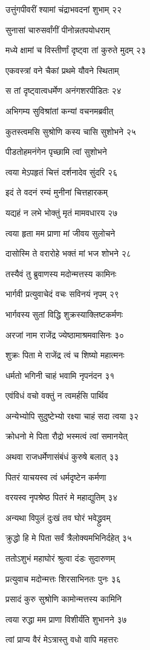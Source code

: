 उत्तुंगपीवरीं श्यामां चंद्राभवदनां शुभाम् २२

सुनासां चारुसर्वांगीं पीनोन्नतपयोधराम्

मध्ये क्षामां च विस्तीर्णां दृष्ट्वा तां कुरुते मुदम् २३

एकवस्त्रां वने चैकां प्रथमे यौवने स्थिताम्

स तां दृष्ट्वात्वधर्मेण अनंगशरपीडितः २४

अभिगम्य सुविश्रांतां कन्यां वचनमब्रवीत्

कुतस्त्वमसि सुश्रोणि कस्य चासि सुशोभने २५

पीडतोहमनंगेन पृच्छामि त्वां सुशोभने

त्वया मेऽपहृतं चित्तं दर्शनादेव सुंदरि २६

इदं ते वदनं रम्यं मुनीनां चित्तहारकम्

यद्यहं न लभे भोक्तुं मृतं मामवधारय २७

त्वया हृता मम प्राणा मां जीवय सुलोचने

दासोस्मि ते वरारोहे भक्तं मां भज शोभने २८

तस्यैवं तु ब्रुवाणस्य मदोन्मत्तस्य कामिनः

भार्गवी प्रत्युवाचेदं वचः सविनयं नृपम् २९

भार्गवस्य सुतां विद्धि शुक्रस्याक्लिष्टकर्मणः

अरजां नाम राजेंद्र ज्येष्ठामाश्रमवासिनः ३०

शुक्रः पिता मे राजेंद्र त्वं च शिष्यो महात्मनः

धर्मतो भगिनी चाहं भवामि नृपनंदन ३१

एवंविधं वचो वक्तुं न त्वमर्हसि पार्थिव

अन्येभ्योपि सुदुष्टेभ्यो रक्ष्या चाहं सदा त्वया ३२

क्रोधनो मे पिता रौद्रो भस्मत्वं त्वां समानयेत्

अथवा राजधर्मेणासंबंधं कुरुषे बलात् ३३

पितरं याचयस्व त्वं धर्मदृष्टेन कर्मणा

वरयस्व नृपश्रेष्ठ पितरं मे महाद्युतिम् ३४

अन्यथा विपुलं दुःखं तव घोरं भवेद्ध्रुवम्

क्रुद्धो हि मे पिता सर्वं त्रैलोक्यमभिनिर्दहेत् ३५

ततोऽशुभं महाघोरं श्रुत्वा दंडः सुदारुणम्

प्रत्युवाच मदोन्मत्तः शिरसाभिनतः पुनः ३६

प्रसादं कुरु सुश्रोणि कामोन्मत्तस्य कामिनि

त्वया रुद्धा मम प्राणा विशीर्यंति शुभानने ३७

त्वां प्राप्य वैरं मेऽत्रास्तु वधो वापि महत्तरः

